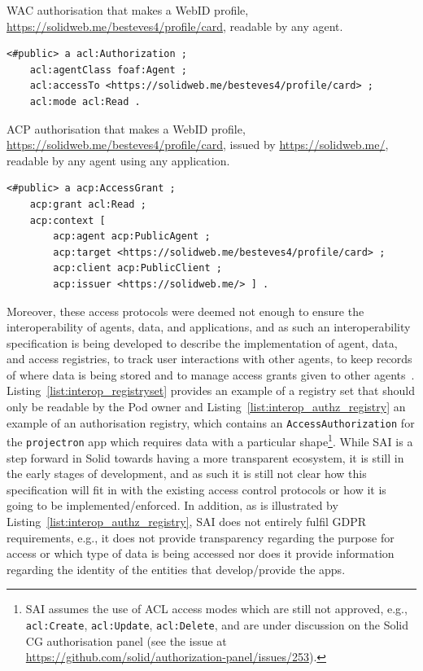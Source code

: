\begin{listing}[ht]
\caption[WAC authorisation.]{WAC authorisation that makes a WebID profile, \url{https://solidweb.me/besteves4/profile/card}, readable by any agent.}
\label{list:wac}
\begin{verbatim}
<#public> a acl:Authorization ;
    acl:agentClass foaf:Agent ;
    acl:accessTo <https://solidweb.me/besteves4/profile/card> ;
    acl:mode acl:Read .
\end{verbatim}
\end{listing}

\begin{listing}[ht]
\caption[ACP authorisation.]{ACP authorisation that makes a WebID profile, \url{https://solidweb.me/besteves4/profile/card}, issued by \url{https://solidweb.me/}, readable by any agent using any application.}
\label{list:acp}
\begin{verbatim}
<#public> a acp:AccessGrant ;
    acp:grant acl:Read ;
    acp:context [
        acp:agent acp:PublicAgent ;
        acp:target <https://solidweb.me/besteves4/profile/card> ;
        acp:client acp:PublicClient ;
        acp:issuer <https://solidweb.me/> ] .
\end{verbatim}
\end{listing}

Moreover, these access protocols were deemed not enough to ensure the interoperability of agents, data, and applications, and as such an interoperability specification is being developed to describe the implementation of agent, data, and access registries, to track user interactions with other agents, to keep records of where data is being stored and to manage access grants given to other agents~\citep{bingham_interop_2023}.
Listing~\ref{list:interop_registryset} provides an example of a registry set that should only be readable by the Pod owner and Listing~\ref{list:interop_authz_registry} an example of an authorisation registry, which contains an \texttt{AccessAuthorization} for the \texttt{projectron} app which requires data with a particular shape\footnote{SAI assumes the use of ACL access modes which are still not approved, e.g., \texttt{acl:Create}, \texttt{acl:Update}, \texttt{acl:Delete}, and are under discussion on the Solid CG authorisation panel (see the issue at \url{https://github.com/solid/authorization-panel/issues/253}).}.
While SAI is a step forward in Solid towards having a more transparent ecosystem, it is still in the early stages of development, and as such it is still not clear how this specification will fit in with the existing access control protocols or how it is going to be implemented/enforced.
In addition, as is illustrated by Listing~\ref{list:interop_authz_registry}, SAI does not entirely fulfil GDPR requirements, e.g., it does not provide transparency regarding the purpose for access or which type of data is being accessed nor does it provide information regarding the identity of the entities that develop/provide the apps.

